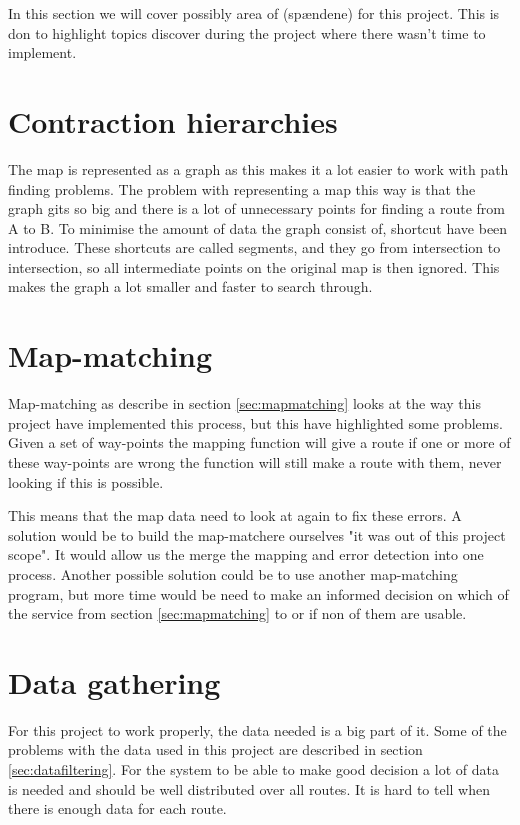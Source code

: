 In this section we will cover possibly area of (spændene) for this project. This is don to highlight topics discover during the project where there wasn't time to implement.
\section{Contraction hierarchies}\label{sec:future:contraction-hierarchies}
The map is represented as a graph as this makes it a lot easier to work with path finding problems. The problem with representing a map this way is that the graph gits so big and there is a lot of unnecessary points for finding a route from A to B. To minimise the amount of data the graph consist of, shortcut have been introduce. These shortcuts are called segments, and they go from intersection to intersection, so all intermediate points on the original map is then ignored. This makes the graph a lot smaller and faster to search through.

\section{Map-matching}\label{sec:future:map-matching}
Map-matching as describe in section \ref{sec:mapmatching} looks at the way this project have implemented this process, but this have highlighted some problems. Given a set of way-points the mapping function will give a route if one or more of these way-points are wrong the function will still make a route with them, never looking if this is possible.

This means that the map data need to look at again to fix these errors. A solution would be to build the map-matchere ourselves "it was out of this project scope". It would allow us the merge the mapping and error detection into one process. Another possible solution could be to use another map-matching program, but more time would be need to make an informed decision on which of the service from section \ref{sec:mapmatching} to or if non of them are usable.

\section{Data gathering}
For this project to work properly, the data needed is a big part of it. Some of the problems with the data used in this project are described in section \ref{sec:datafiltering}. For the system to be able to make good decision a lot of data is needed and should be well distributed over all routes. It is hard to tell when there is enough data for each route. 

